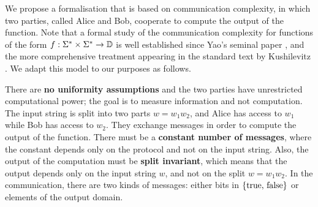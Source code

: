 We propose a formalisation that is based on communication complexity, in which
two parties, called Alice and Bob, cooperate to compute the output of the
function. Note that a formal study of the communication complexity for
functions of the form $f : \Sigma^* \times \Sigma^* \to \mathbb D$ is well
established since Yao's seminal paper \cite{YAO79}, and the more comprehensive
treatment appearing in the standard text by Kushilevitz \cite{KUSH97}.
We adapt
this model to our purposes as follows.

There are \textbf{no uniformity assumptions} and the two parties
have unrestricted computational power; the goal is to measure information 
and
not computation.  The input string is split into two parts $w = w_1 w_2$, and
Alice has access to $w_1$ while Bob has access to $w_2$. They exchange messages
in order to compute the output of the  function. There must be a
\textbf{constant number of messages}, where the constant  depends only on the
protocol and not on the input string. Also, the  output of the computation must
be \textbf{split invariant}, which means that the output depends only on the
input string $w$, and not on the split $w = w_1 w_2$. In the communication,
there are two kinds of messages:  either bits in $\{\text{true, false}\}$  or
elements of the output domain.
